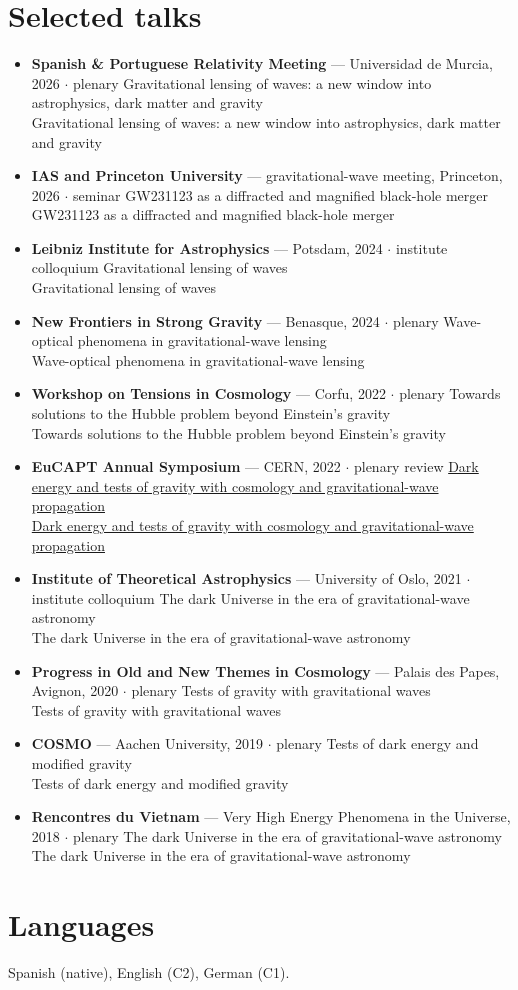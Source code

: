 \documentclass[11pt,a4paper]{article}
\newcommand{\entry}[2]{%
  \item {#1}%
  \ifx\relax#2\relax\else\\[0.1em]{\small\color{soft}#2}\fi
}
\newenvironment{entries}
  {\begin{itemize}[leftmargin=1.1em,itemsep=0.32em,parsep=0pt,topsep=0.3em]}
  {\end{itemize}}
\begin{document}
\section{Selected talks}
\begin{entries}
  \entry{\textbf{Spanish \& Portuguese Relativity Meeting} --- Universidad de Murcia, 2026 $\cdot$ plenary}
        {Gravitational lensing of waves: a new window into astrophysics, dark matter and gravity}
  \entry{\textbf{IAS and Princeton University} --- gravitational-wave meeting, Princeton, 2026 $\cdot$ seminar}
        {GW231123 as a diffracted and magnified black-hole merger}
  \entry{\textbf{Leibniz Institute for Astrophysics} --- Potsdam, 2024 $\cdot$ institute colloquium}
        {Gravitational lensing of waves}
  \entry{\textbf{New Frontiers in Strong Gravity} --- Benasque, 2024 $\cdot$ plenary}
        {Wave-optical phenomena in gravitational-wave lensing}
  \entry{\textbf{Workshop on Tensions in Cosmology} --- Corfu, 2022 $\cdot$ plenary}
        {Towards solutions to the Hubble problem beyond Einstein's gravity}
  \entry{\textbf{EuCAPT Annual Symposium} --- CERN, 2022 $\cdot$ plenary review}
        {\href{https://cds.cern.ch/record/2810852}{Dark energy and tests of gravity with cosmology and gravitational-wave propagation}}
  \entry{\textbf{Institute of Theoretical Astrophysics} --- University of Oslo, 2021 $\cdot$ institute colloquium}
        {The dark Universe in the era of gravitational-wave astronomy}
  \entry{\textbf{Progress in Old and New Themes in Cosmology} --- Palais des Papes, Avignon, 2020 $\cdot$ plenary}
        {Tests of gravity with gravitational waves}
  \entry{\textbf{COSMO} --- Aachen University, 2019 $\cdot$ plenary}
        {Tests of dark energy and modified gravity}
  \entry{\textbf{Rencontres du Vietnam} --- Very High Energy Phenomena in the Universe, 2018 $\cdot$ plenary}
        {The dark Universe in the era of gravitational-wave astronomy}
\end{entries}

\section{Languages}
Spanish (native), English (C2), German (C1).
\end{document}
